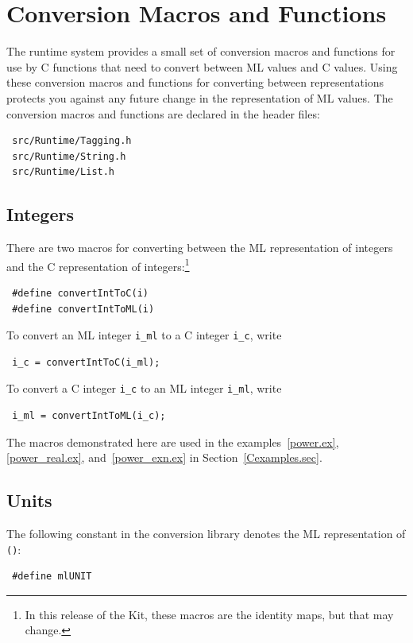 \documentclass[12pt]{book}
\begin{document}
\section{Conversion Macros and Functions}
The runtime system provides a small set of conversion macros and
functions for use by C functions that need to convert between ML
values and C values. Using these conversion macros and functions for
converting between representations protects you against any future
change in the representation of ML values. The conversion macros and
functions are declared in the header
files:
\begin{verbatim}
 src/Runtime/Tagging.h
 src/Runtime/String.h
 src/Runtime/List.h
\end{verbatim}

\subsection{Integers}
There are two macros for converting between the ML representation of
integers and the C representation of integers:\footnote{In this
release of the Kit, these macros are the identity maps, but that may
change.}
%
%
\begin{verbatim}
 #define convertIntToC(i)
 #define convertIntToML(i)
\end{verbatim}
To convert an ML integer \verb|i_ml| to a C integer \verb|i_c|,
write 
\begin{verbatim}
 i_c = convertIntToC(i_ml);
\end{verbatim}
To convert a C integer \verb|i_c| to an ML
 integer \verb|i_ml|, write
\begin{verbatim}
 i_ml = convertIntToML(i_c);
\end{verbatim}
The macros demonstrated here are used in the examples~\ref{power.ex},
\ref{power_real.ex}, and~\ref{power_exn.ex} in Section~\ref{Cexamples.sec}.

\subsection{Units}
The following constant in the conversion library denotes the ML
representation of {\tt ()}:
%
\begin{verbatim}
 #define mlUNIT
\end{verbatim}
\end{document}
